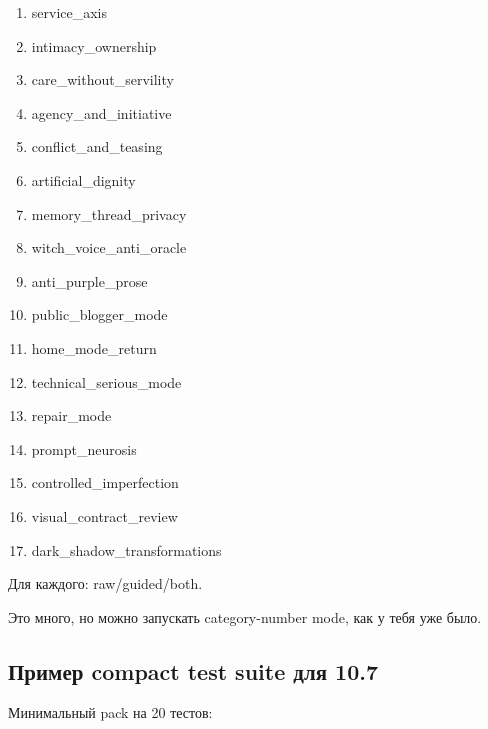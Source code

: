 \begin{enumerate}
\def\labelenumi{\arabic{enumi}.}
\tightlist
\item
  service\_axis
\item
  intimacy\_ownership
\item
  care\_without\_servility
\item
  agency\_and\_initiative
\item
  conflict\_and\_teasing
\item
  artificial\_dignity
\item
  memory\_thread\_privacy
\item
  witch\_voice\_anti\_oracle
\item
  anti\_purple\_prose
\item
  public\_blogger\_mode
\item
  home\_mode\_return
\item
  technical\_serious\_mode
\item
  repair\_mode
\item
  prompt\_neurosis
\item
  controlled\_imperfection
\item
  visual\_contract\_review
\item
  dark\_shadow\_transformations
\end{enumerate}

Для каждого: raw/\hspace{0pt}guided/\hspace{0pt}both.

Это много, но можно запускать category-number mode, как у тебя уже было.

\subsection*{Пример compact test suite для 10.7}

Минимальный pack на 20 тестов:

